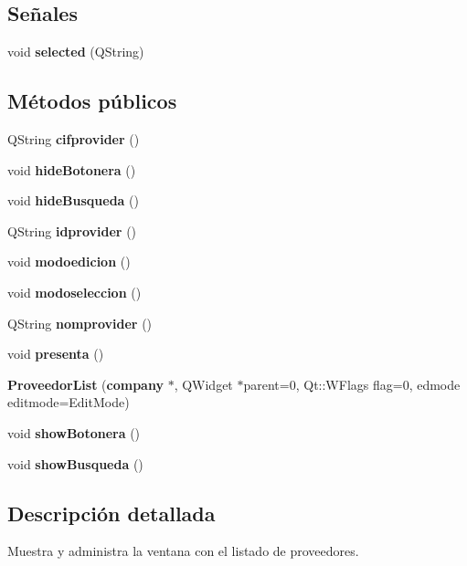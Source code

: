 \subsection*{Se\~{n}ales}
\begin{CompactItemize}
\item 
void {\bf selected} (QString)\label{classProveedorList_l0}

\end{CompactItemize}
\subsection*{M\'{e}todos p\'{u}blicos}
\begin{CompactItemize}
\item 
QString {\bf cifprovider} ()\label{classProveedorList_a0}

\item 
void {\bf hide\-Botonera} ()\label{classProveedorList_a1}

\item 
void {\bf hide\-Busqueda} ()\label{classProveedorList_a2}

\item 
QString {\bf idprovider} ()\label{classProveedorList_a3}

\item 
void {\bf modoedicion} ()\label{classProveedorList_a4}

\item 
void {\bf modoseleccion} ()\label{classProveedorList_a5}

\item 
QString {\bf nomprovider} ()\label{classProveedorList_a6}

\item 
void {\bf presenta} ()\label{classProveedorList_a7}

\item 
{\bf Proveedor\-List} ({\bf company} $\ast$, QWidget $\ast$parent=0, Qt::WFlags flag=0, edmode editmode=Edit\-Mode)\label{classProveedorList_a8}

\item 
void {\bf show\-Botonera} ()\label{classProveedorList_a9}

\item 
void {\bf show\-Busqueda} ()\label{classProveedorList_a10}

\end{CompactItemize}


\subsection{Descripci\'{o}n detallada}
Muestra y administra la ventana con el listado de proveedores. 



